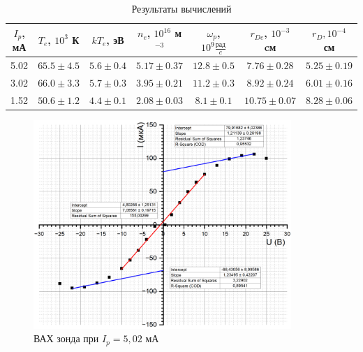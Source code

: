 \documentclass[a4paper, 12pt]{article}
\begin{document}
	\begin{table}[h!]
		\centering
		\begin{tabular}{|c|c|c|c|c|c|c|}
			\hline
			$I_p$, мА  & $T_e$, $10^3$ К & $kT_e$, эВ & $n_e$, $10^{16}$ м$^{-3}$ & $\omega_p$, $10^9 \frac{\text{рад}}{c}$ & $r_{De}$, $10^{-3}$ cм & $r_D, 10^{-4}$ см  \\ \hline
			5.02   & $65.5\pm 4.5$ & $5.6 \pm 0.4$ & $5.17 \pm 0.37$                     & $12.8\pm 0.5$                   & $7.76\pm 0.28$    &   $5.25 \pm 0.19$            \\ \hline
			3.02   & $66.0\pm 3.3$ & $5.7 \pm 0.3$ &$3.95\pm 0.21$                     & $11.2\pm 0.3$                    & $8.92\pm 0.24$    &  $6.01 \pm 0.16$               \\ \hline
			1.52   & $50.6	\pm 1.2$ &$4.4 \pm 0.1$ &$2.08\pm 0.03$                    & $8.1\pm 0.1$                     & $10.75 \pm 0.07$  &  $8.28 \pm 0.06$                 \\ \hline
		\end{tabular}
		\caption{Результаты вычислений}
	\end{table}
	
	\begin{figure}
		\centering
		\includegraphics[width = 0.87\textwidth, height = 0.45\textheight]{5mA}
		\caption{ВАХ зонда при $I_p = 5,02$ мА}
	\end{figure}
	
\end{document}
